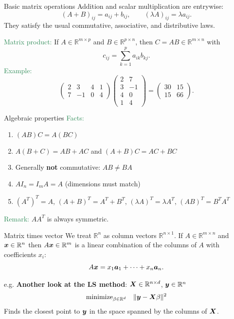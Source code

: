 \documentclass[11pt,aspectratio=169]{beamer}
\begin{document}
\begin{frame}{Basic matrix operations}
Addition and scalar multiplication are entrywise:
\[
(A+B)_{ij}=a_{ij}+b_{ij},\qquad (\lambda A)_{ij}=\lambda a_{ij}.
\]
They satisfy the usual commutative, associative, and distributive laws.
\bigskip

\textcolor{SeaGreen}{Matrix product:} If $A\in\mathbb{R}^{m\times p}$ and $B\in\mathbb{R}^{p\times n}$, then $C=AB\in\mathbb{R}^{m\times n}$ with
\[
c_{ij}=\sum_{k=1}^p a_{ik}b_{kj}.
\]
\textcolor{SeaGreen}{Example:}
\[
\begin{pmatrix}2& 3 & 4 & 1\\
7 & -1 & 0 & 4
\end{pmatrix} 
\begin{pmatrix}2& 7\\
3 & -1 \\
4 & 0 \\
1& 4
\end{pmatrix}
=
\begin{pmatrix}30&  15\\
15 & 66
\end{pmatrix}.
\]
\end{frame}

\begin{frame}{Algebraic properties}
\textcolor{SeaGreen}{Facts:}
\begin{enumerate}
\item $(AB)C=A(BC)$
\item $A(B+C)=AB+AC$ and $(A+B)C=AC+BC$
\item Generally \textbf{not} commutative: $AB\neq BA$
\item $AI_n=I_mA=A$ (dimensions must match)
\item $(A^T)^T=A$, $(A+B)^T=A^T+B^T$, $(\lambda A)^T=\lambda A^T$, $(AB)^T=B^T A^T$
\end{enumerate}
\textcolor{SeaGreen}{Remark:} $AA^T$ is always symmetric.
\end{frame}

\begin{frame}{Matrix times vector}
We treat $\mathbb{R}^n$ as column vectors $\mathbb{R}^{n\times 1}$. If $A\in\mathbb{R}^{m\times n}$ and $\boldsymbol x\in\mathbb{R}^n$ then $A\boldsymbol x\in\mathbb{R}^m$ is a linear combination of the columns of $A$ with coefficients $x_i$:
\[
A\boldsymbol x = x_1\boldsymbol a_1+\cdots+x_n\boldsymbol a_n.
\]
\bigskip

e.g. \textbf{Another look at the LS method}: $\boldsymbol X\in \mathbb R^{n\times d}$, $\boldsymbol y\in \mathbb R^n$
$$
{\rm minimize}_{\beta\in \mathbb R^d}\quad \|\boldsymbol y-\boldsymbol X\beta\|^2
$$
Finds the closest point to $\boldsymbol y$ in the space spanned by the columns of $\boldsymbol X$.
\end{frame}
\end{document}
